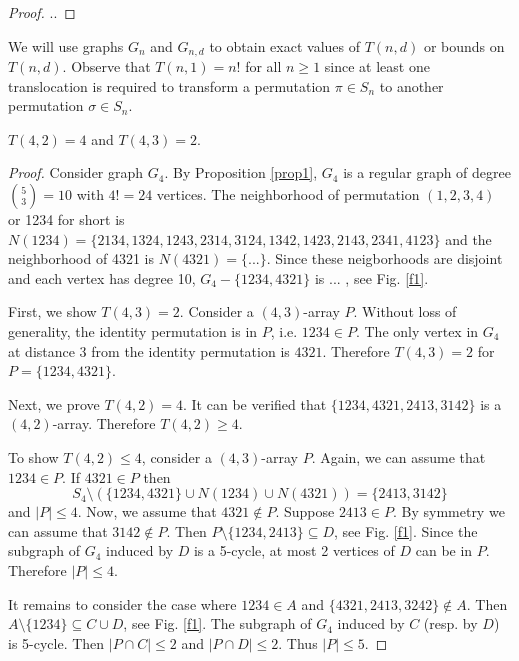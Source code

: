 \documentclass[runningheads]{llncs}
\begin{document}

\begin{proof}
..    
\end{proof}

We will use graphs $G_n$ and $G_{n,d}$ to obtain exact values of $T(n,d)$ or bounds on $T(n,d)$.
Observe that $T(n,1)=n!$ for all $n\ge 1$ since at least one translocation is required to transform a permutation $\pi\in S_n$ to another permutation $\sigma\in S_n$. 

\begin{theorem}
$T(4,2)=4$ and $T(4,3)=2$.    
\end{theorem}

\begin{proof}
Consider graph $G_4$. 
By Proposition \ref{prop1}, $G_4$ is a regular graph of degree $\binom{5}{3}=10$ with $4!=24$ vertices.
The neighborhood of permutation $(1,2,3,4)$ or 1234 for short is $N(1234)=\{2134, 1324, 1243, 2314, 3124, 1342, 1423, 2143, 2341, 4123\}$ and the neighborhood of 4321 is $N(4321)=\{...\}$. 
Since these neigborhoods are disjoint and each vertex has degree 10, $G_{4}-\{1234,4321\}$ is ...
, see Fig. \ref{f1}.

First, we show $T(4,3)=2$.
Consider a $(4,3)$-array $P$.
Without loss of generality, the identity permutation is in $P$, i.e. $1234\in P$. 
The only vertex in $G_4$ at distance 3 from the identity permutation is $4321$. 
Therefore $T(4,3)=2$ for $P=\{1234,4321\}$.

Next, we prove $T(4,2)=4$.
It can be verified that $\{1234,4321,2413,3142\}$ is a $(4,2)$-array. Therefore $T(4,2)\ge 4$.  

To show $T(4,2)\le 4$, consider a $(4,3)$-array $P$.
Again, we can assume that $1234\in P$.
If $4321\in P$ then 
\[ S_4\setminus (\{1234,4321\}\cup N(1234)\cup N(4321)) = \{2413,3142\}\]
and $|P|\le 4$.
Now, we assume that $4321\notin P$.
Suppose $2413\in P$. 
By symmetry we can assume that $3142\notin P$.
Then $P\setminus\{1234,2413\}\subseteq D$, see Fig. \ref{f1}.
Since the subgraph of $G_4$ induced by $D$ is a 5-cycle, at most 2 vertices of $D$ can be in $P$.
Therefore $|P|\le 4$.

It remains to consider the case where $1234\in A$ and 
$\{4321,2413,3242\}\notin A$.
Then $A\setminus\{1234\}\subseteq C\cup D$, see Fig. \ref{f1}. 
The subgraph of $G_4$ induced by $C$ (resp. by $D$) is 5-cycle. 
Then $|P\cap C|\le 2$ and $|P\cap D|\le 2$.
Thus $|P|\le 5$.


\end{proof}
\end{document}
